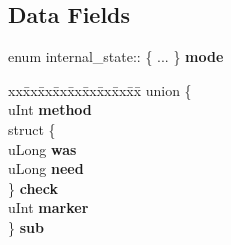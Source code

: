 \subsection*{Data Fields}
\begin{DoxyCompactItemize}
\item 
\mbox{\label{structinternal__state_a0137ee69706634b7ffdcc8cf3fdfbf63}} 
enum internal\+\_\+state\+:: \{ ... \}  {\bfseries mode}
\item 
\mbox{\label{structinternal__state_a7f00c5fe13f545901cb892d3a7760689}} 
\begin{tabbing}
xx\=xx\=xx\=xx\=xx\=xx\=xx\=xx\=xx\=\kill
union \{\\
\>uInt {\bfseries method}\\
\>struct \{\\
\>\>uLong {\bfseries was}\\
\>\>uLong {\bfseries need}\\
\>\} {\bfseries check}\\
\>uInt {\bfseries marker}\\
\} {\bfseries sub}\\


\end{tabbing}
\end{DoxyCompactItemize}

